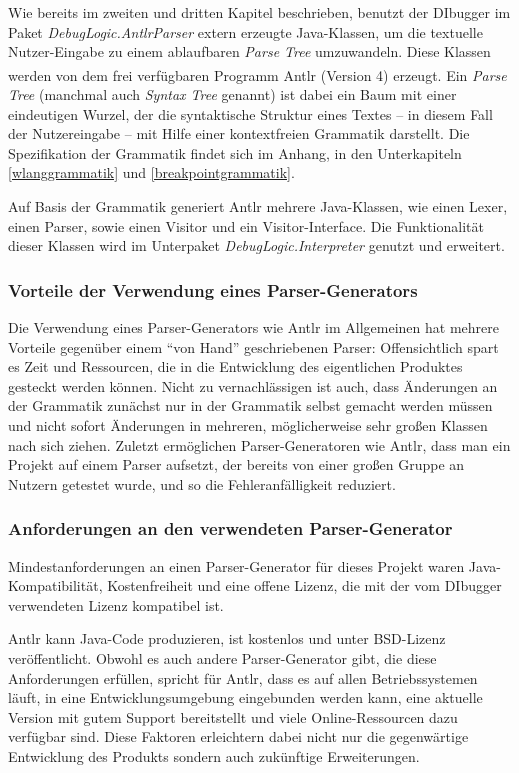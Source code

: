 \documentclass[parskip=full]{scrartcl}
\begin{document}
Wie bereits im zweiten und dritten Kapitel beschrieben, benutzt der DIbugger im Paket \textit{DebugLogic.AntlrParser} extern erzeugte Java-Klassen, um die textuelle Nutzer-Eingabe zu einem ablaufbaren \textit{Parse Tree} umzuwandeln. 
Diese Klassen werden von dem frei verfügbaren Programm Antlr\textsuperscript{\textcopyright} (Version 4) erzeugt.
Ein \textit{Parse Tree} (manchmal auch \textit{Syntax Tree} genannt) ist dabei ein Baum mit einer eindeutigen Wurzel, der die syntaktische Struktur eines Textes – in diesem Fall der Nutzereingabe – mit Hilfe einer kontextfreien Grammatik darstellt. 
Die Spezifikation der Grammatik findet sich im Anhang, in den Unterkapiteln \ref{wlanggrammatik} und \ref{breakpointgrammatik}.

Auf Basis der Grammatik generiert Antlr mehrere Java-Klassen, wie einen Lexer, einen Parser, sowie einen Visitor und ein Visitor-Interface. 
Die Funktionalität dieser Klassen wird im Unterpaket \textit{DebugLogic.Interpreter} genutzt und erweitert.

\subsubsection{Vorteile der Verwendung eines Parser-Generators}
Die Verwendung eines Parser-Generators wie Antlr im Allgemeinen hat mehrere Vorteile gegenüber einem “von Hand” geschriebenen Parser: Offensichtlich spart es Zeit und Ressourcen, die in die Entwicklung des eigentlichen Produktes gesteckt werden können. 
Nicht zu vernachlässigen ist auch, dass Änderungen an der Grammatik zunächst nur in der Grammatik selbst gemacht werden müssen und nicht sofort Änderungen in mehreren, möglicherweise sehr großen Klassen nach sich ziehen. 
Zuletzt ermöglichen Parser-Generatoren wie Antlr, dass man ein Projekt auf einem Parser aufsetzt, der bereits von einer großen Gruppe an Nutzern getestet wurde, und so die Fehleranfälligkeit reduziert.

\subsubsection{Anforderungen an den verwendeten Parser-Generator}

Mindestanforderungen an einen Parser-Generator für dieses Projekt waren Java-Kompatibilität, Kostenfreiheit und eine offene Lizenz, die mit der vom DIbugger verwendeten Lizenz kompatibel ist.

Antlr kann Java-Code produzieren, ist kostenlos und unter BSD-Lizenz veröffentlicht.
Obwohl es auch andere Parser-Generator gibt, die diese Anforderungen erfüllen, spricht für Antlr, dass es auf allen Betriebssystemen läuft, in eine Entwicklungsumgebung eingebunden werden kann, eine aktuelle Version mit gutem Support bereitstellt und viele Online-Ressourcen dazu verfügbar sind.
Diese Faktoren erleichtern dabei nicht nur die gegenwärtige Entwicklung des Produkts sondern auch zukünftige Erweiterungen.
\end{document}
